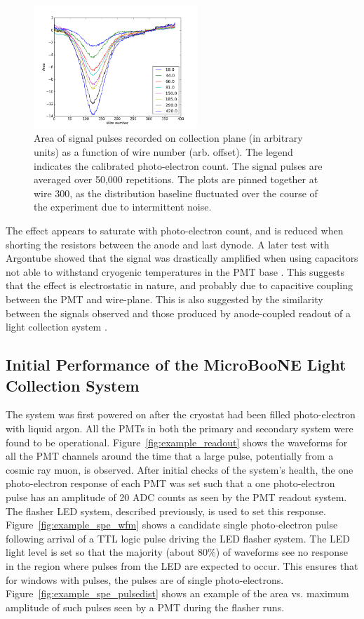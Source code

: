 \begin{figure}
\centering 
\includegraphics[width=0.55\textwidth]{./figures/PMT_xtalk_PE_plot.png}
\caption{Area of signal pulses recorded on collection plane (in arbitrary units) as a function of wire number (arb. offset). The legend indicates the calibrated photo-electron count. The signal pulses are averaged over 50,000 repetitions. The plots are pinned together at wire 300, as the distribution baseline fluctuated over the course of the experiment due to intermittent noise.
 \label{fig:PMTxtalk}  }
\end{figure}


The effect appears to saturate with photo-electron count, and is reduced when shorting the resistors between the anode and last dynode. A later test with Argontube showed that the signal was drastically amplified when using capacitors not able to withstand cryogenic temperatures in the PMT base \cite{BernPrivate}. This suggests that the effect is electrostatic in nature, and probably due to capacitive coupling between the PMT and wire-plane.  This is also suggested by the similarity between the signals observed and those produced by anode-coupled readout of a light collection system \cite{Moss:2015hha}.

\subsection{Initial Performance of the MicroBooNE Light Collection System}

The system was first powered on after the cryostat had been filled photo-electron with liquid argon.  All the PMTs in both the primary and secondary system were found to be operational.  Figure~\ref{fig:example_readout} shows the waveforms for all the PMT channels around the time that a large pulse, potentially from a cosmic ray muon, is observed.  After initial checks of the system's health, the one photo-electron response of each PMT was set such that a one photo-electron pulse has an amplitude of 20 ADC counts as seen by the PMT readout system.  The flasher LED system, described previously, is used to set this response. Figure~\ref{fig:example_spe_wfm} shows a candidate single photo-electron pulse following arrival of a TTL logic pulse driving the LED flasher system.  The LED light level is set so that the majority (about 80\%) of waveforms see no response in the region where pulses from the LED are expected to occur.  This ensures that for windows with pulses, the pulses are of single photo-electrons.  Figure~\ref{fig:example_spe_pulsedist} shows an example of the area vs. maximum amplitude of such pulses seen by a PMT during the flasher runs.


